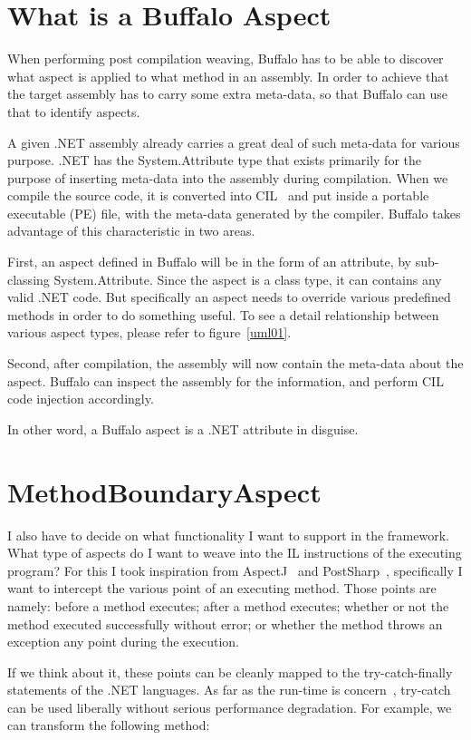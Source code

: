 \section{What is a Buffalo Aspect}

When performing post compilation weaving, Buffalo has to be able to discover what aspect is applied to what method in an assembly. In order to achieve that the target assembly has to carry some extra meta-data, so that Buffalo can use that to identify aspects.

A given .NET assembly already carries a great deal of such meta-data for various purpose. .NET has the System.Attribute type that exists primarily for the purpose of inserting meta-data into the assembly during compilation. When we compile the source code, it is converted into CIL~\cite{msil_text} and put inside a portable executable (PE) file, with the meta-data generated by the compiler. Buffalo takes advantage of this characteristic in two areas.

First, an aspect defined in Buffalo will be in the form of an attribute, by sub-classing System.Attribute. Since the aspect is a class type, it can contains any valid .NET code. But specifically an aspect needs to override various predefined methods in order to do something useful. To see a detail relationship between various aspect types, please refer to figure~\ref{uml01}.

Second, after compilation, the assembly will now contain the meta-data about the aspect. Buffalo can inspect the assembly for the information, and perform CIL code injection accordingly.

In other word, a Buffalo aspect is a .NET attribute in disguise.

\section{MethodBoundaryAspect}
I also have to decide on what functionality I want to support in the framework. What type of aspects do I want to weave into the IL instructions of the executing program? For this I took inspiration from AspectJ~\cite{aspectj_faq} and PostSharp~\cite{postsharp}, specifically I want to intercept the various point of an executing method. Those points are namely: before a method executes; after a method executes; whether or not the method executed successfully without error; or whether the method throws an exception any point during the execution.

If we think about it, these points can be cleanly mapped to the try-catch-finally statements of the .NET languages. As far as the run-time is concern~\cite{ecma334, ecma335}, try-catch can be used liberally without serious performance degradation. For example, we can transform the following method:

